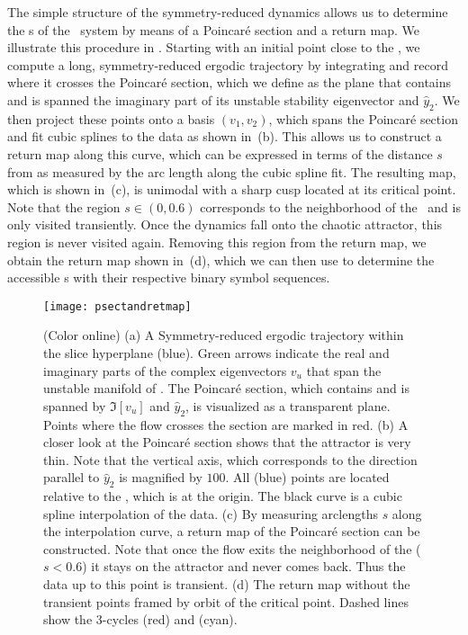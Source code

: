 \documentclass[aip,cha,
reprint,
secnumarabic,
nofootinbib, tightenlines,
nobibnotes, showkeys, showpacs,
superscriptaddress,
]{revtex4-1}
\begin{document}
The simple structure of the symmetry-reduced dynamics allows us to
determine the \rpo s of the \twomode\ system by means of a Poincar\'e
section and a return map. We illustrate this procedure in
. Starting with an initial point close to the
\REQV{}{}, we compute a long, symmetry-reduced ergodic trajectory by integrating
 and record where it crosses the Poincar\'e section, which we
define as the plane that contains \REQV{}{} and is spanned the imaginary part of its unstable stability
eigenvector and $\hat{y}_2$.
We then project these points onto a basis $(v_1, v_2)$, which
spans the Poincar\'e section and fit cubic splines to the data as shown in \,(b).
This allows us to construct a return map along this curve, which can be expressed in terms of the distance $s$ from \REQV{}{}
as measured by the arc length along the cubic spline fit. The resulting map, which is shown in
\,(c), is unimodal with a sharp cusp located at its critical point.
Note that the region $s \in (0, 0.6)$ corresponds to
the neighborhood of the \reqv\  and is only visited transiently. Once the dynamics fall onto the chaotic
attractor, this region is never visited again. Removing this region from the return map, we
obtain the return map shown in \,(d), which we can then use to determine the
accessible \rpo s  with their respective binary symbol sequences.

\begin{figure}
\centering
  \texttt{[image: psectandretmap]} 
\caption{(Color online)
         (a) A Symmetry-reduced ergodic trajectory within the slice hyperplane 
             (blue). Green arrows indicate the real and imaginary parts of the 
             complex eigenvectors $v_u$ that span the unstable manifold of 
             \REQV{}{}. The Poincar\'e section, which contains \REQV{}{} and 
             is spanned by $\Im[v_u]$ and $\hat{y}_2$, is visualized as a 
             transparent plane. Points where the flow crosses the section are marked 
             in red.
		 (b) A closer look at the Poincar\'e section shows that the attractor is very thin.
		 	 Note that the vertical axis, which corresponds to the direction 
		 	 parallel to $\hat{y}_2$ is magnified by $100$. All (blue) points 
		 	 are located relative to the \REQV{}{}, which is at the origin.
		 	 The black curve is a cubic spline interpolation of the data.		  	
		 (c) By measuring arclengths $s$ along the interpolation curve, a return map 
		 of the Poincar\'e section can be constructed. 
			 Note that once the flow exits the neighborhood of the \REQV{}{} 
			 ($s < 0.6$) it stays on the attractor and never comes back. Thus the data 
			 up to this point is transient.
		 (d) The return map without the transient points framed by orbit of the 
		     critical point. Dashed lines show the 3-cycles  (red) and 
		      (cyan).}
\label{fig:psectandretmap}
\end{figure}
\end{document}

